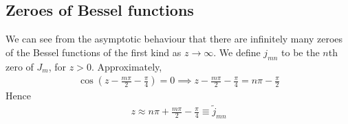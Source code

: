 \subsection{Zeroes of Bessel functions}
We can see from the asymptotic behaviour that there are infinitely many zeroes of the Bessel functions of the first kind as $z \to \infty$.
We define $j_{mn}$ to be the $n$th zero of $J_m$, for $z > 0$.
Approximately,
\begin{align*}
	\cos(z - \frac{m \pi}{2} - \frac{\pi}{4}) = 0 \implies z - \frac{m \pi}{2} - \frac{\pi}{4} = n \pi - \frac{\pi}{2}
\end{align*}
Hence
\begin{align*}
	z \approx n \pi + \frac{m \pi}{2} - \frac{\pi}{4} \equiv \widetilde j_{mn}
\end{align*}

